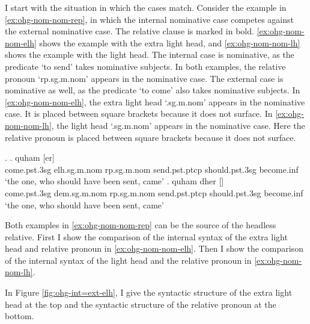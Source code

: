 I start with the situation in which the cases match.
Consider the example in \ref{ex:ohg-nom-nom-rep}, in which the internal nominative case competes against the external nominative case. The relative clause is marked in bold. \ref{ex:ohg-nom-nom-elh} shows the example with the extra light head, and \ref{ex:ohg-nom-nom-lh} shows the example with the light head.
The internal case is nominative, as the predicate  `to send' takes nominative subjects.
In both examples, the relative pronoun  `\ac{rp}.\ac{sg}.\ac{m}.\ac{nom}' appears in the nominative case.
The external case is nominative as well, as the predicate  `to come' also takes nominative subjects.
In \ref{ex:ohg-nom-nom-elh}, the extra light head  `.\ac{sg}.\ac{m}.\ac{nom}' appears in the nominative case. It is placed between square brackets because it does not surface.
In \ref{ex:ohg-nom-nom-lh}, the light head  `.\ac{sg}.\ac{m}.\ac{nom}' appears in the nominative case. Here the relative pronoun is placed between square brackets because it does not surface.

\ex.\label{ex:ohg-nom-nom-rep}
\ag. quham [er]    \\
 come.\ac{pst}.3\ac{sg}\scsub{[nom]} \ac{elh}.\ac{sg}.\ac{m}.\ac{nom} \ac{rp}.\ac{sg}.\ac{m}.\ac{nom} send.\ac{pst}.\ac{ptcp}\scsub{[nom]} should.\ac{pst}.3\ac{sg} become.\ac{inf}\\
 `the one, who should have been sent, came' \label{ex:ohg-nom-nom-elh}
\bg. quham dher []   \\
 come.\ac{pst}.3\ac{sg}\scsub{[nom]} \ac{dem}.\ac{sg}.\ac{m}.\ac{nom} \ac{rp}.\ac{sg}.\ac{m}.\ac{nom} send.\ac{pst}.\ac{ptcp}\scsub{[nom]} should.\ac{pst}.3\ac{sg} become.\ac{inf}\\
 `the one, who should have been sent, came' \label{ex:ohg-nom-nom-lh}

Both examples in \ref{ex:ohg-nom-nom-rep} can be the source of the headless relative. First I show the comparison of the internal syntax of the extra light head and relative pronoun in \ref{ex:ohg-nom-nom-elh}. Then I show the comparison of the internal syntax of the light head and the relative pronoun in \ref{ex:ohg-nom-nom-lh}.

In Figure \ref{fig:ohg-int=ext-elh}, I give the syntactic structure of the extra light head at the top and the syntactic structure of the relative pronoun at the bottom.


